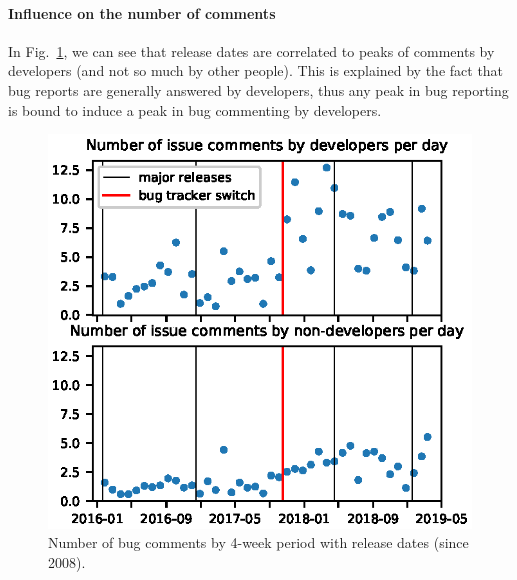 \documentclass[conference]{IEEEtran}
\begin{document}
\paragraph{Influence on the number of comments}
In Fig.~\ref{comments_with_releases}, we can see that release dates are correlated to peaks of comments by developers (and not so much by other people). This is explained by the fact that bug reports are generally answered by developers, thus any peak in bug reporting is bound to induce a peak in bug commenting by developers.

\begin{figure}
\includegraphics{comments_with_releases.eps}
\caption{Number of bug comments by 4-week period with release dates (since 2008).} \label{comments_with_releases}
\end{figure}
\end{document}
